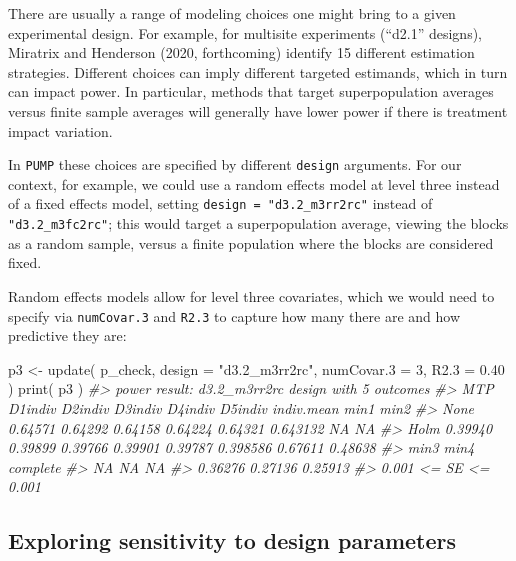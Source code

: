 \documentclass[
]{article}
\newenvironment{Shaded}{\begin{snugshade}}{\end{snugshade}}
\newcommand{\AttributeTok}[1]{\textcolor[rgb]{0.77,0.63,0.00}{#1}}
\newcommand{\CommentTok}[1]{\textcolor[rgb]{0.56,0.35,0.01}{\textit{#1}}}
\newcommand{\DecValTok}[1]{\textcolor[rgb]{0.00,0.00,0.81}{#1}}
\newcommand{\FloatTok}[1]{\textcolor[rgb]{0.00,0.00,0.81}{#1}}
\newcommand{\FunctionTok}[1]{\textcolor[rgb]{0.00,0.00,0.00}{#1}}
\newcommand{\NormalTok}[1]{#1}
\newcommand{\OtherTok}[1]{\textcolor[rgb]{0.56,0.35,0.01}{#1}}
\newcommand{\StringTok}[1]{\textcolor[rgb]{0.31,0.60,0.02}{#1}}
\begin{document}
There are usually a range of modeling choices one might bring to a given
experimental design. For example, for multisite experiments (``d2.1''
designs), Miratrix and Henderson (2020, forthcoming) identify 15
different estimation strategies. Different choices can imply different
targeted estimands, which in turn can impact power. In particular,
methods that target superpopulation averages versus finite sample
averages will generally have lower power if there is treatment impact
variation.

In \texttt{PUMP} these choices are specified by different
\texttt{design} arguments. For our context, for example, we could use a
random effects model at level three instead of a fixed effects model,
setting \texttt{design\ =\ "d3.2\_m3rr2rc"} instead of
\texttt{"d3.2\_m3fc2rc"}; this would target a superpopulation average,
viewing the blocks as a random sample, versus a finite population where
the blocks are considered fixed.

Random effects models allow for level three covariates, which we would
need to specify via \texttt{numCovar.3} and \texttt{R2.3} to capture how
many there are and how predictive they are:

\begin{Shaded}
\begin{Highlighting}[]
\NormalTok{p3 }\OtherTok{\textless{}{-}} \FunctionTok{update}\NormalTok{( p\_check, }\AttributeTok{design =} \StringTok{"d3.2\_m3rr2rc"}\NormalTok{, }\AttributeTok{numCovar.3 =} \DecValTok{3}\NormalTok{, }\AttributeTok{R2.3 =} \FloatTok{0.40}\NormalTok{ )}
\FunctionTok{print}\NormalTok{( p3 )}
\CommentTok{\#\textgreater{} power result: d3.2\_m3rr2rc design with 5 outcomes}
\CommentTok{\#\textgreater{}   MTP D1indiv D2indiv D3indiv D4indiv D5indiv indiv.mean    min1    min2}
\CommentTok{\#\textgreater{}  None 0.64571 0.64292 0.64158 0.64224 0.64321   0.643132      NA      NA}
\CommentTok{\#\textgreater{}  Holm 0.39940 0.39899 0.39766 0.39901 0.39787   0.398586 0.67611 0.48638}
\CommentTok{\#\textgreater{}     min3    min4 complete}
\CommentTok{\#\textgreater{}       NA      NA       NA}
\CommentTok{\#\textgreater{}  0.36276 0.27136  0.25913}
\CommentTok{\#\textgreater{}  0.001 \textless{}= SE \textless{}= 0.001}
\end{Highlighting}
\end{Shaded}

\subsection{Exploring sensitivity to design parameters}
\end{document}
